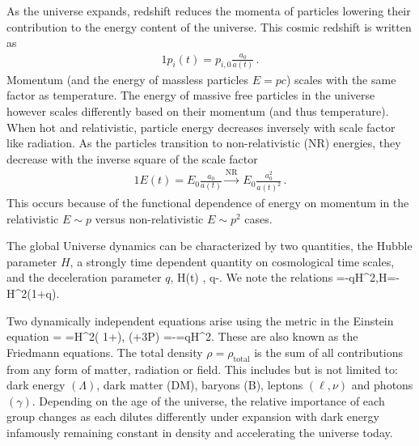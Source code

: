 As the universe expands, redshift reduces the momenta of particles lowering their contribution to the energy content of the universe. This cosmic redshift is written as
\begin{alignat}{1}
 \label{Redshift} p_{i}(t) = p_{i,0}\frac{a_{0}}{a(t)}\,.
\end{alignat}
Momentum (and the energy of massless particles $E=pc$) scales with the same factor as temperature. The energy of massive free particles in the universe however scales differently based on their momentum (and thus temperature). When hot and relativistic, particle energy decreases inversely with scale factor like radiation. As the particles transition to non-relativistic (NR) energies, they decrease with the inverse square of the scale factor
\begin{alignat}{1}
 \label{EScale} E(t) = E_{0}\frac{a_{0}}{a(t)}\xrightarrow{\mathrm{NR}}\ E_{0}\frac{a_{0}^{2}}{a(t)^{2}}\,.
\end{alignat}
This occurs because of the functional dependence of energy on momentum in the relativistic $E\sim p$ versus non-relativistic $E\sim p^{2}$ cases.


The global Universe dynamics can be characterized by two quantities, the Hubble parameter $H$, a strongly time dependent quantity on cosmological time scales, and the deceleration parameter $q$,
\beqn\label{dynamic}
\equiv H(t) ,\quad 
q\equiv -.
\eeqn
We note the relations
\beqn
\quad {}=-qH^2,\quad \dot H=-H^2(1+q). 
\eeqn

Two dynamically independent equations arise using the metric  in the Einstein equation 
\beqn\label{hubble}
 \rho = 
=H^2\left( 1+\right),
\qquad
{} (\rho+3P) =-=qH^2.
\eeqn
These are also known as the Friedmann equations. The total density $\rho=\rho_\mathrm{total}$ is the sum of all contributions from any form of matter, radiation or field. This includes but is not limited to: dark energy $(\Lambda)$, dark matter (DM), baryons (B), leptons $(\ell,\nu)$ and photons $(\gamma)$. Depending on the age of the universe, the relative importance of each group changes as each dilutes differently under expansion with dark energy infamously remaining constant in density and accelerating the universe today.

